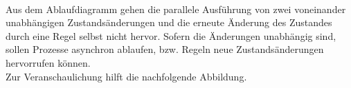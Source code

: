         \\
        Aus dem Ablaufdiagramm gehen die parallele Ausführung von zwei voneinander unabhängigen Zustandsänderungen und die 
        erneute Änderung des Zustandes durch eine Regel selbst nicht hervor. Sofern die Änderungen unabhängig 
        sind, sollen Prozesse asynchron ablaufen, bzw. Regeln neue Zustandsänderungen hervorrufen können. 
        \\
        Zur Veranschaulichung hilft die nachfolgende Abbildung. 
        